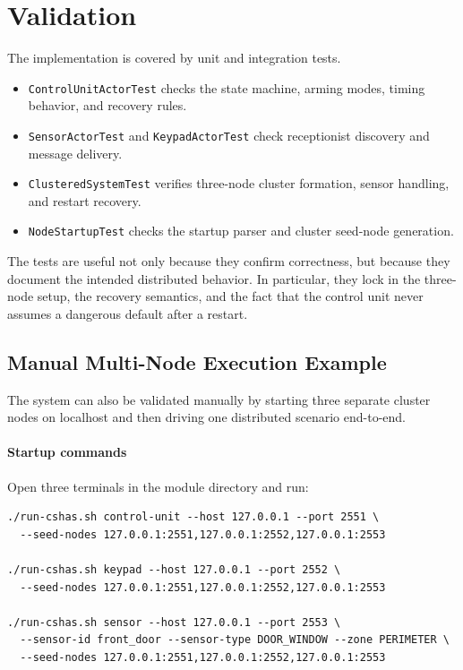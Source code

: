 \clearpage
\section{Validation}

The implementation is covered by unit and integration tests.
\begin{itemize}
    \item \texttt{ControlUnitActorTest} checks the state machine, arming modes, timing behavior, and recovery rules.
    \item \texttt{SensorActorTest} and \texttt{KeypadActorTest} check receptionist discovery and message delivery.
    \item \texttt{ClusteredSystemTest} verifies three-node cluster formation, sensor handling, and restart recovery.
    \item \texttt{NodeStartupTest} checks the startup parser and cluster seed-node generation.
\end{itemize}

The tests are useful not only because they confirm correctness, but because
they document the intended distributed behavior. In particular, they lock in
the three-node setup, the recovery semantics, and the fact that the control
unit never assumes a dangerous default after a restart.

\subsection{Manual Multi-Node Execution Example}

The system can also be validated manually by starting three separate cluster
nodes on localhost and then driving one distributed scenario end-to-end.

\paragraph{Startup commands}
Open three terminals in the module directory and run:
\begin{verbatim}
./run-cshas.sh control-unit --host 127.0.0.1 --port 2551 \
  --seed-nodes 127.0.0.1:2551,127.0.0.1:2552,127.0.0.1:2553

./run-cshas.sh keypad --host 127.0.0.1 --port 2552 \
  --seed-nodes 127.0.0.1:2551,127.0.0.1:2552,127.0.0.1:2553

./run-cshas.sh sensor --host 127.0.0.1 --port 2553 \
  --sensor-id front_door --sensor-type DOOR_WINDOW --zone PERIMETER \
  --seed-nodes 127.0.0.1:2551,127.0.0.1:2552,127.0.0.1:2553
\end{verbatim}

